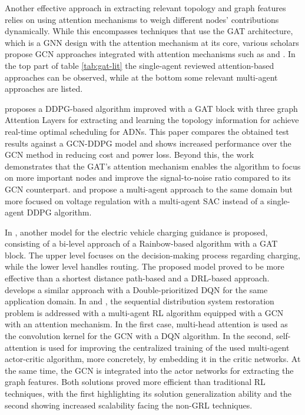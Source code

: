 Another effective approach in extracting relevant topology and graph features relies on using attention mechanisms to weigh different nodes' contributions dynamically. While this encompasses techniques that use the \ac{GAT} architecture, which is a \ac{GNN} design with the attention mechanism at its core, various scholars propose \ac{GCN} approaches integrated with attention mechanisms such as \cite{zhaoLearningSequentialDistribution2022} and \cite{fanAttentionBasedMultiAgentGraph2023}. In the top part of table \ref{tab:gat-lit} the single-agent reviewed attention-based approaches can be observed, while at the bottom some relevant multi-agent approaches are listed.  \par
\cite{xingRealtimeOptimalScheduling2023} proposes a \ac{DDPG}-based algorithm improved with a \ac{GAT} block with three graph Attention Layers for extracting and learning the topology information for achieve real-time optimal scheduling for \acp{ADN}. This paper compares the obtained test results against a \ac{GCN}-\ac{DDPG} model and shows increased performance over the \ac{GCN} method in reducing cost and power loss. Beyond this, the work demonstrates that the \ac{GAT}'s attention mechanism enables the algorithm to focus on more important nodes and improve the signal-to-noise ratio compared to its \ac{GCN} counterpart. \cite{chenPhysicalassistedMultiagentGraph2023} and propose a multi-agent approach to the same domain but more focused on voltage regulation with a multi-agent \ac{SAC} instead of a single-agent \ac{DDPG} algorithm. \par
In \cite{xingBilevelGraphReinforcement2023}, another model for the electric vehicle charging guidance is proposed, consisting of a bi-level approach of a Rainbow-based algorithm with a \ac{GAT} block. The upper level focuses on the decision-making process regarding charging, while the lower level handles routing. The proposed model proved to be more effective than a shortest distance path-based \cite{xingModellingDrivingCharging2021} and a \ac{DRL}-based \cite{qianDeepReinforcementLearning2020} approach. \cite{xuRealtimeFastCharging2022} develops a similar approach with a Double-prioritized DQN for the same application domain.
In \cite{zhaoLearningSequentialDistribution2022} and \cite{fanAttentionBasedMultiAgentGraph2023}, the sequential distribution system restoration problem is addressed with a multi-agent \ac{RL} algorithm equipped with a \ac{GCN} with an attention mechanism. In the first case, multi-head attention is used as the convolution kernel for the \ac{GCN} with a \ac{DQN} algorithm. In the second, self-attention is used for improving the centralized training of the used multi-agent actor-critic algorithm, more concretely, by embedding it in the critic networks. At the same time, the \ac{GCN} is integrated into the actor networks for extracting the graph features. Both solutions proved more efficient than traditional \ac{RL} techniques, with the first highlighting its solution generalization ability and the second showing increased scalability facing the non-GRL techniques. 
